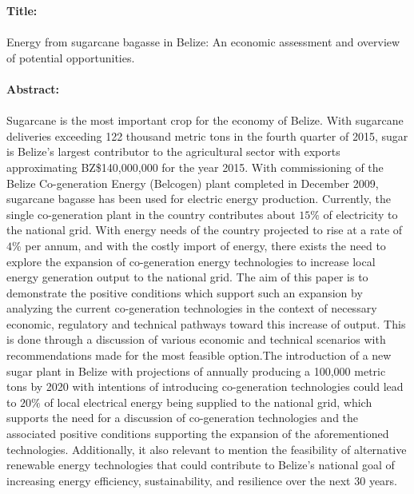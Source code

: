 \documentclass[12pt]{article}
\begin{document}
\noindent
\textbf{Title:} \\
\\Energy from sugarcane bagasse in Belize: An economic assessment and overview of potential opportunities. \\ \\
\noindent\textbf{Abstract:}\\
\\Sugarcane is the most important crop for the economy of Belize. With sugarcane deliveries exceeding 122 thousand metric tons in the fourth quarter of 2015, sugar is Belize's largest contributor to the agricultural sector with exports approximating BZ\$140,000,000 for the year 2015. With commissioning of the Belize Co-generation Energy (Belcogen) plant completed in December 2009, sugarcane bagasse has been used for electric energy production. Currently, the single co-generation plant in the country contributes about $15\%$ of electricity to the national grid. With energy needs of the country projected to rise at a rate of $4\%$ per annum, and with the costly import of energy, there exists the need to explore the expansion of co-generation energy technologies to increase local energy generation output to the national grid. The aim of this paper is to demonstrate the positive conditions which support such an expansion by analyzing the current co-generation technologies in the context of necessary economic, regulatory and technical pathways toward this increase of output. This is done through a discussion of various economic and technical scenarios with recommendations made for the most feasible option.The introduction of a new sugar plant in Belize with projections of annually producing a 100,000 metric tons by 2020 with intentions of introducing co-generation technologies could lead to $20\%$ of local electrical energy being supplied to the national grid, which supports the need for a discussion of co-generation technologies and the associated positive conditions supporting the expansion of the aforementioned technologies. Additionally, it also relevant to mention the feasibility of alternative renewable energy technologies that could contribute to Belize's national goal of increasing energy efficiency, sustainability, and resilience over the next 30 years. 
\end{document}
